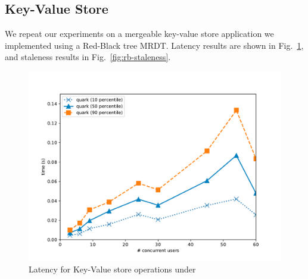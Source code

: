 
\subsection{Key-Value Store}

We repeat our experiments on a mergeable key-value store application
we implemented using a Red-Black tree MRDT. Latency results are shown
in Fig.~\ref{fig:rb-latency}, and staleness results in
Fig.~\ref{fig:rb-staleness}.

\begin{figure}[ht]
  \centering
    \includegraphics[scale=0.4]{Figures/rbmonkey_latency}
  \caption{Latency for Key-Value store operations under \quark}
\label{fig:rb-latency}
  \vspace*{-0.2in}
\end{figure}

